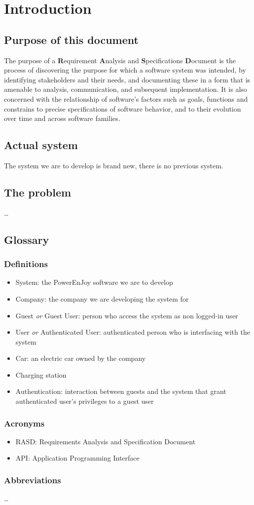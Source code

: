 \section{Introduction}
\subsection{Purpose of this document}
The purpose of a \textbf{R}equirement \textbf{A}nalysis and \textbf{S}pecifications \textbf{D}ocument is the process of discovering the purpose for which a software system was intended, by identifying stakeholders and their needs, and documenting these in a form that is amenable to analysis, communication, and subsequent implementation.  It is also concerned with the relationship of software's factors such as goals, functions and constrains to precise specifications of software behavior, and to their evolution over time and across software families.

	\subsection{Actual system}
The system we are to develop is brand new, there is no previous system.
\subsection{The problem}
 \ldots
\subsection{Glossary}
	\subsubsection{Definitions}
	\begin{itemize}
		\item System: the PowerEnJoy software we are to develop
		\item Company: the company we are developing the system for
		\item Guest \emph{or} Guest User: person who access the system as non logged-in user
		\item User \emph{or} Authenticated User: authenticated person who is interfacing with the system
		\item Car: an electric car owned by the company
		\item Charging station
		\item Authentication: interaction between guests and the system that grant authenticated user's privileges to a guest user
	\end{itemize}
\subsubsection{Acronyms}
	\begin{itemize}
		\item RASD: Requirements Analysis and Specification Document
		\item API: Application Programming Interface
	\end{itemize}
\subsubsection{Abbreviations}
 \ldots
